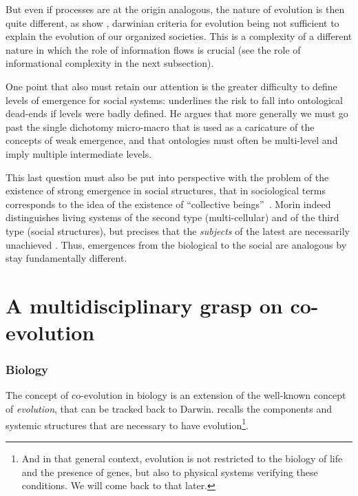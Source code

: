 \documentclass[letterpaper]{article}
\begin{document}
But even if processes are at the origin analogous, the nature of evolution is then quite different, as show \cite{vanderLeeuw2009}, darwinian criteria for evolution being not sufficient to explain the evolution of our organized societies. This is a complexity of a different nature in which the role of information flows is crucial (see the role of informational complexity in the next subsection).

One point that also must retain our attention is the greater difficulty to define levels of emergence for social systems: \cite{roth2009reconstruction} underlines the risk to fall into ontological dead-ends if levels were badly defined. He argues that more generally we must go past the single dichotomy micro-macro that is used as a caricature of the concepts of weak emergence, and that ontologies must often be multi-level and imply multiple intermediate levels.

This last question must also be put into perspective with the problem of the existence of strong emergence in social structures, that in sociological terms corresponds to the idea of the existence of ``collective beings''~\cite{angeletti2015etres}. Morin indeed distinguishes living systems of the second type (multi-cellular) and of the third type (social structures), but precises that the \emph{subjects} of the latest are necessarily unachieved \citep{morin1980methode}. Thus, emergences from the biological to the social are analogous by stay fundamentally different.




\section{A multidisciplinary grasp on co-evolution}



\subsubsection{Biology}

The concept of co-evolution in biology is an extension of the well-known concept of \emph{evolution}, that can be tracked back to Darwin. \cite{durham1991coevolution} recalls the components and systemic structures that are necessary to have evolution\footnote{And in that general context, evolution is not restricted to the biology of life and the presence of genes, but also to physical systems verifying these conditions. We will come back to that later.}.
\end{document}
